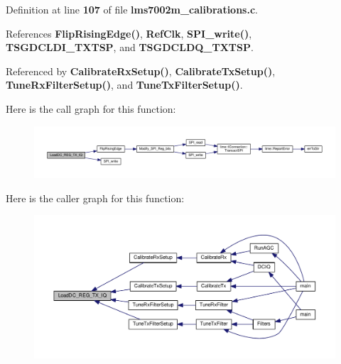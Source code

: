 Definition at line {\bf 107} of file {\bf lms7002m\+\_\+calibrations.\+c}.



References {\bf Flip\+Rising\+Edge()}, {\bf Ref\+Clk}, {\bf S\+P\+I\+\_\+write()}, {\bf T\+S\+G\+D\+C\+L\+D\+I\+\_\+\+T\+X\+T\+SP}, and {\bf T\+S\+G\+D\+C\+L\+D\+Q\+\_\+\+T\+X\+T\+SP}.



Referenced by {\bf Calibrate\+Rx\+Setup()}, {\bf Calibrate\+Tx\+Setup()}, {\bf Tune\+Rx\+Filter\+Setup()}, and {\bf Tune\+Tx\+Filter\+Setup()}.



Here is the call graph for this function\+:
\nopagebreak
\begin{figure}[H]
\begin{center}
\leavevmode
\includegraphics[width=350pt]{d1/dc7/lms7002m__calibrations_8h_a9c51685034dd7ae8c5406902e8e95ba7_cgraph}
\end{center}
\end{figure}




Here is the caller graph for this function\+:
\nopagebreak
\begin{figure}[H]
\begin{center}
\leavevmode
\includegraphics[width=350pt]{d1/dc7/lms7002m__calibrations_8h_a9c51685034dd7ae8c5406902e8e95ba7_icgraph}
\end{center}
\end{figure}



